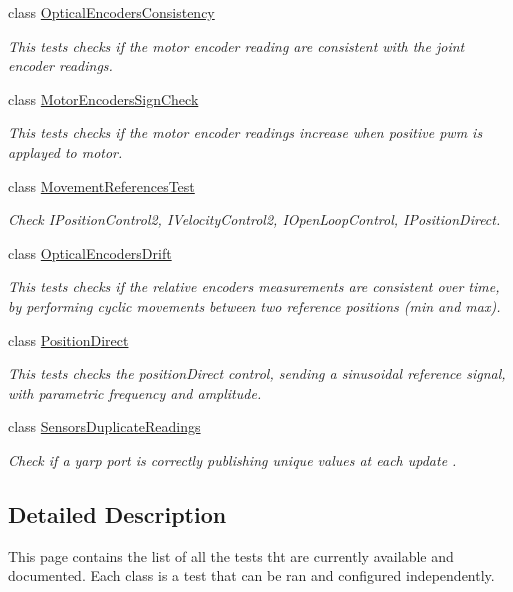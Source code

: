 \begin{DoxyCompactItemize}
class \hyperlink{classOpticalEncodersConsistency}{Optical\-Encoders\-Consistency}
\begin{DoxyCompactList}\small\item\em This tests checks if the motor encoder reading are consistent with the joint encoder readings. \end{DoxyCompactList}\item 
class \hyperlink{classMotorEncodersSignCheck}{Motor\-Encoders\-Sign\-Check}
\begin{DoxyCompactList}\small\item\em This tests checks if the motor encoder readings increase when positive pwm is applayed to motor. \end{DoxyCompactList}\item 
class \hyperlink{classMovementReferencesTest}{Movement\-References\-Test}
\begin{DoxyCompactList}\small\item\em Check I\-Position\-Control2, I\-Velocity\-Control2, I\-Open\-Loop\-Control, I\-Position\-Direct. \end{DoxyCompactList}\item 
class \hyperlink{classOpticalEncodersDrift}{Optical\-Encoders\-Drift}
\begin{DoxyCompactList}\small\item\em This tests checks if the relative encoders measurements are consistent over time, by performing cyclic movements between two reference positions (min and max). \end{DoxyCompactList}\item 
class \hyperlink{classPositionDirect}{Position\-Direct}
\begin{DoxyCompactList}\small\item\em This tests checks the position\-Direct control, sending a sinusoidal reference signal, with parametric frequency and amplitude. \end{DoxyCompactList}\item 
class \hyperlink{classSensorsDuplicateReadings}{Sensors\-Duplicate\-Readings}
\begin{DoxyCompactList}\small\item\em Check if a yarp port is correctly publishing unique values at each update . \end{DoxyCompactList}\end{DoxyCompactItemize}


\subsection{Detailed Description}
This page contains the list of all the tests tht are currently available and documented. Each class is a test that can be ran and configured independently.

